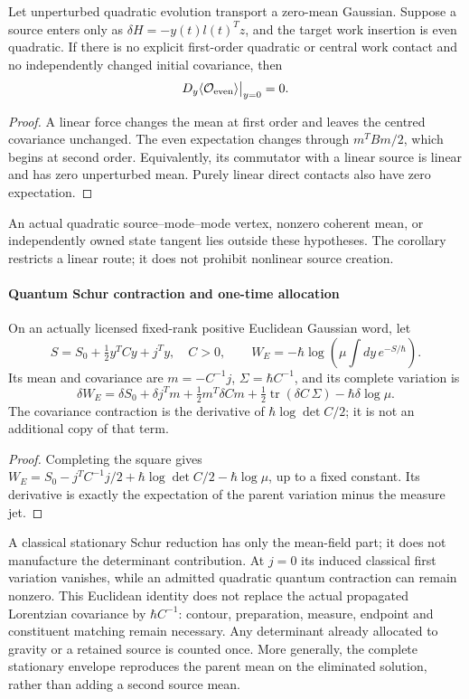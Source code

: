 \documentclass[12pt,a4paper]{article}
\begin{document}
\begin{corollary}
\label{p4:cor:v2203-gaussian-linear-even-parity}
Let unperturbed quadratic evolution transport a zero-mean Gaussian.
Suppose a source enters only as \(\delta H=-y(t)l(t)^Tz\), and the
target work insertion is even quadratic.  If there is no explicit
first-order quadratic or central work contact and no independently
changed initial covariance, then
\[
 D_y\langle\mathcal O_{\rm even}\rangle\big|_{y=0}=0.
\]
\end{corollary}
\begin{proof}
A linear force changes the mean at first order and leaves the centred
covariance unchanged.  The even expectation changes through
\(m^TBm/2\), which begins at second order.  Equivalently, its
commutator with a linear source is linear and has zero unperturbed mean.
Purely linear direct contacts also have zero expectation.
\end{proof}
An actual quadratic source--mode--mode vertex, nonzero coherent mean,
or independently owned state tangent lies outside these hypotheses.
The corollary restricts a linear route; it does not prohibit nonlinear
source creation.

\paragraph{Quantum Schur contraction and one-time allocation}
\begin{proposition}
\label{p4:prop:v2203-quantum-schur-nonduplication}
On an actually licensed fixed-rank positive Euclidean Gaussian word,
let
\[
 S=S_0+\tfrac12y^TCy+j^Ty,\quad C>0,\qquad
 W_E=-\hbar\log\left(\mu\int dy\,e^{-S/\hbar}\right).
\]
Its mean and covariance are \(m=-C^{-1}j\), \(\Sigma=\hbar C^{-1}\),
and its complete variation is
\[
 \boxed{\delta W_E=\delta S_0+\delta j^Tm
 +\tfrac12m^T\delta C m
 +\tfrac12\operatorname{tr}(\delta C\,\Sigma)
 -\hbar\delta\log\mu.}
\]
The covariance contraction is the derivative of
\(\hbar\log\det C/2\); it is not an additional copy of that term.
\end{proposition}
\begin{proof}
Completing the square gives
\(W_E=S_0-j^TC^{-1}j/2+\hbar\log\det C/2-
\hbar\log\mu\), up to a fixed constant.  Its derivative is exactly
the expectation of the parent variation minus the measure jet.
\end{proof}
A classical stationary Schur reduction has only the mean-field part;
it does not manufacture the determinant contribution.  At \(j=0\)
its induced classical first variation vanishes, while an admitted
quadratic quantum contraction can remain nonzero.  This Euclidean
identity does not replace the actual propagated Lorentzian covariance
by \(\hbar C^{-1}\): contour, preparation, measure, endpoint and
constituent matching remain necessary.  Any determinant already
allocated to gravity or a retained source is counted once.  More
generally, the complete stationary envelope reproduces the parent mean
on the eliminated solution, rather than adding a second source mean.
\end{document}
